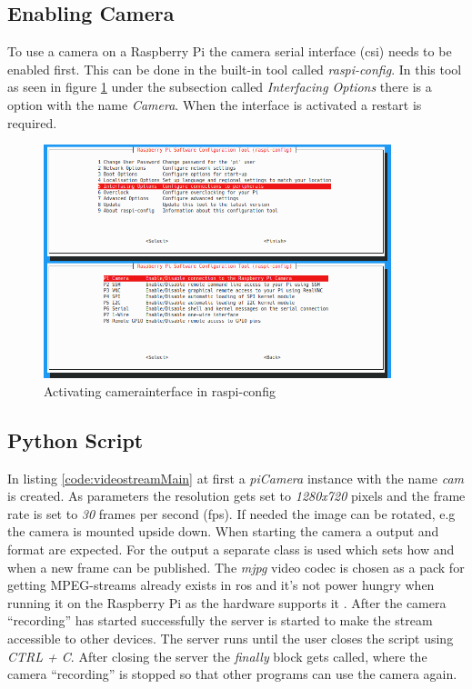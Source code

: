 \subsection{Enabling Camera}
To use a camera on a Raspberry Pi the camera serial interface (\gls{csi}) needs to be enabled first. This can be done in the built-in tool called \textit{raspi-config}. In this tool as seen in figure \ref{img:raspiconfig} under the subsection called \textit{Interfacing Options} there is a option with the name \textit{Camera}. When the interface is activated a restart is required.\newline
\begin{figure}[h]
	\centering
	\includegraphics[width=0.9\textwidth]{./media/images/raspiconfig.png}
  	\caption{Activating camerainterface in raspi-config}
  	\label{img:raspiconfig}
\end{figure}

\subsection{Python Script}\label{ref:streamPythonScript}
In listing \ref{code:videostreamMain} at first a \textit{piCamera} instance with the name \textit{cam} is created. As parameters the resolution gets set to \textit{1280x720} pixels and the frame rate is set to \textit{30} frames per second (\gls{fps}). If needed the image can be rotated, e.g the camera is mounted upside down. When starting the camera a output and format are expected. For the output a separate class is used which sets how and when a new frame can be published. The \textit{mjpg} video codec is chosen as a pack for getting MPEG-streams already exists in \gls{ros} and it's not power hungry when running it on the Raspberry Pi as the hardware supports it \cite{raspberrypi3bplusspecs}. \newline
After the camera \enquote{recording} has started successfully the server is started to make the stream accessible to other devices. The server runs until the user closes the script using \textit{CTRL + C}. After closing the server the \textit{finally} block gets called, where the camera \enquote{recording} is stopped so that other programs can use the camera again.\newline


